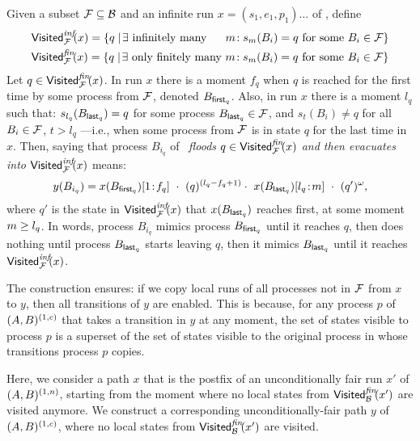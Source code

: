 Given a subset $\mathcal{F} \subseteq \mathcal{B}$
and an infinite run $x=(s_1,e_1,p_1)\ldots$ of \largesys, 
define
\begin{align}
& \mathsf{Visited}^{\textit{inf}}_{\mathcal{F}}\!(x) = \{ q \mid\! \exists \text{ infinitely many } ~~~~ m\!:  
s_m(B_i) = q 
\text{ for some } B_i \in \mathcal{F} \} \label{disj:def_vinf_wrt} \\
& \mathsf{Visited}^{\textit{fin}}_{\mathcal{F}}\!(x) = \{ q \mid\! \exists \text{ only finitely many } m\!:  
s_m(B_i) = q
\text{ for some } B_i\in \mathcal{F} \} \label{disj:def_vfin_wrt}
\end{align}
%
Let $q \in \mathsf{Visited}^{\textit{fin}}_{\mathcal{F}}\!(x)$.
In run $x$ there is a moment $f_q$ when $q$
is reached for the first time by some process from $\mathcal{F}$, denoted $B_{\mathsf{first}_q}$. 
Also, in run $x$ there is a moment $l_q$ such that:
$s_{l_q}(B_{\mathsf{last}_q})=q$ for some process $B_{\mathsf{last}_q} \in \mathcal{F}$, 
and $s_t(B_i)\neq q$ for all $B_i \in \mathcal{F}$,
$t > l_q$%
---i.e., when some process from $\mathcal{F}$ is in state $q$ for the last time in $x$. 
Then, saying that process $B_{i_q}$ of \cutoffsys\ 
{\em floods $q \in \mathsf{Visited}^{\textit{fin}}_{\mathcal{F}}\!(x)$ and then evacuates into $\mathsf{Visited}^{\textit{inf}}_{\mathcal{F}}\!(x)$} 
means: 
$$
y(B_{i_q}) = x(B_{\first_q})\slice{1}{f_q} \ \cdot\ (q)^{(l_q - f_q + 1)} \cdot \ 
x(B_{\last_q})\slice{l_q}{m} \ \cdot \ (q')^\omega,
$$
where $q'$ is the state in $\mathsf{Visited}^{\textit{inf}}_{\mathcal{F}}\!(x)$ that $x(B_{\mathsf{last}_q})$ reaches first, 
at some moment $m \geq l_q$.
In words, process $B_{i_q}$ mimics process $B_{\mathsf{first}_q}$ until it reaches $q$, 
then does nothing until process $B_{\mathsf{last}_q}$ starts leaving $q$, 
then it mimics $B_{\mathsf{last}_q}$ until it reaches $\mathsf{Visited}^{\textit{inf}}_{\mathcal{F}}\!(x)$.

The construction ensures: 
if we copy local runs of all processes not in $\mathcal{F}$ from $x$ to $y$, 
then all transitions of $y$ are enabled. 
This is because, for any process $p$ of $(A,B)^{(1,c)}$ that takes a transition in $y$ at any moment, 
the set of states visible to process $p$ is a superset of the set of states 
visible to the original process in \largesys whose transitions process $p$ copies.


\ak{adapt to dead}
Here, we consider a path $x$ that is the postfix of an unconditionally fair run $x'$ of $(A,B)^{(1,n)}$, 
starting from the moment where no local states from $\mathsf{Visited}^{\textit{fin}}_{\mathcal{B}}\!(x')$ are visited anymore. 
We construct a corresponding unconditionally-fair path $y$ of $(A,B)^{(1,c)}$, 
where no local states from $\mathsf{Visited}^{\textit{fin}}_{\mathcal{B}}\!(x')$ are visited.

